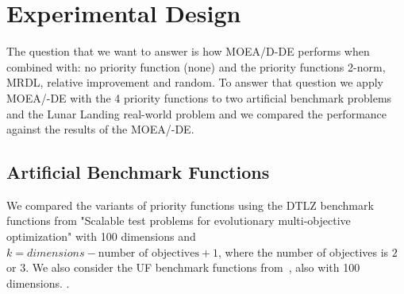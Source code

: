 \section{Experimental Design}

%


The question that we want to answer is how MOEA/D-DE performs when combined with: no priority function (none) and the priority functions 2-norm, MRDL, relative improvement and random. To answer that question we apply MOEA/-DE with the 4 priority functions to two artificial benchmark problems and the Lunar Landing real-world problem and we compared the performance against the results of the MOEA/-DE.

\subsection{Artificial Benchmark Functions}

We compared the variants of priority functions using the DTLZ benchmark functions from "Scalable test problems for evolutionary multi-objective optimization" with 100 dimensions and $k = dimensions - \text{number of objectives} + 1$, where the number of objectives is $2$ or $3$. We also consider the UF benchmark functions from~\cite{zhang2008multiobjective}, also with 100 dimensions. 
.

